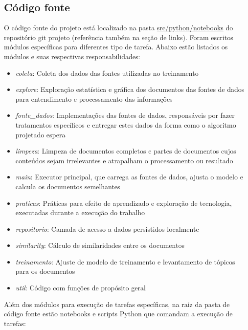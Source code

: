 \subsection{Código fonte}

O código fonte do projeto está localizado na pasta \href{https://github.com/heldergr/tcc-pucmg-2/tree/main/src/python/notebooks}{src/python/notebooks} 
do repositório git projeto (referência também na seção de links). Foram escritos módulos específicas para diferentes tipo de tarefa. 
Abaixo estão listados os módulos e suas respectivas responsabilidades:

\begin{itemize}
    \item \textit{coleta}: Coleta dos dados das fontes utilizadas no treinamento
    \item \textit{explore}: Exploração estatística e gráfica dos documentos das fontes de dados para entendimento e processamento das informações
    \item \textit{fonte\_dados}: Implementações das fontes de dados, responsáveis por fazer tratamentos específicos e entregar estes dados da 
    forma como o algoritmo projetado espera
    \item \textit{limpeza}: Limpeza de documentos completos e partes de documentos cujos conteúdos sejam irrelevantes e atrapalham o processamento ou resultado
    \item \textit{main}: Executor principal, que carrega as fontes de dados, ajusta o modelo e calcula os documentos semelhantes
    \item \textit{praticas}: Práticas para efeito de aprendizado e exploração de tecnologia, executadas durante a execução do trabalho
    \item \textit{repositorio}: Camada de acesso a dados persistidos localmente
    \item \textit{similarity}: Cálculo de similaridades entre os documentos
    \item \textit{treinamento}: Ajuste de modelo de treinamento e levantamento de tópicos para os documentos
    \item \textit{util}: Código com funções de propósito geral
\end{itemize}

Além dos módulos para execução de tarefas específicas, na raiz da pasta de código fonte estão notebooks e scripts Python que comandam a execução de 
tarefas:

